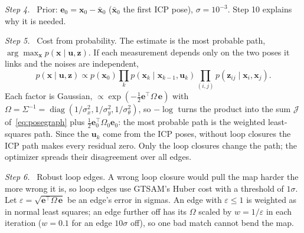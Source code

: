 \documentclass[letterpaper, 10pt, conference]{ieeeconf}
\newcommand{\x}{\mathbf{x}}
\newcommand{\step}[1]{\par\noindent\textit{Step #1.}\ }
\begin{document}
\step{4} Prior: $\mathbf{e}_0=\x_0-\bar{\x}_0$ ($\bar{\x}_0$ the first ICP
pose), $\sigma=10^{-3}$. Step 10 explains why it is needed.

\step{5} Cost from probability. The estimate is the most probable path,
$\arg\max_{\x}p(\x\mid\mathbf{u},\mathbf{z})$. If each measurement depends
only on the two poses it links and the noises are independent,
\begin{equation}
p(\x\mid\mathbf{u},\mathbf{z})\propto p(\x_0)\prod_k p(\x_k\mid\x_{k-1},\mathbf{u}_k)\prod_{(i,j)}p(\mathbf{z}_{ij}\mid\x_i,\x_j).
\end{equation}
Each factor is Gaussian, $\propto\exp(-\tfrac12\mathbf{e}^\top\Omega\,\mathbf{e})$
with $\Omega=\Sigma^{-1}=\operatorname{diag}(1/\sigma_x^2,1/\sigma_y^2,1/\sigma_\theta^2)$,
so $-\log$ turns the product into the sum $\mathcal{J}$
of~\eqref{eq:posegraph} plus $\tfrac12\mathbf{e}_0^\top\Omega_0\mathbf{e}_0$:
the most probable path is the weighted least-squares path. Since the
$\mathbf{u}_k$ come from the ICP poses, without loop closures the ICP path
makes every residual zero. Only the loop closures change the path; the
optimizer spreads their disagreement over all edges.

\step{6} Robust loop edges. A wrong loop closure would pull the map
harder the more wrong it is, so loop edges use GTSAM's Huber cost with a
threshold of $1\sigma$. Let $\varepsilon=\sqrt{\mathbf{e}^\top\Omega\,\mathbf{e}}$
be an edge's error in sigmas. An edge with $\varepsilon\le1$ is weighted as
in normal least squares; an edge further off has its $\Omega$ scaled by
$w=1/\varepsilon$ in each iteration ($w=0.1$ for an edge $10\sigma$ off), so
one bad match cannot bend the map.
\end{document}

